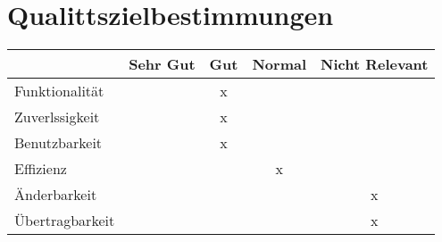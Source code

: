 
\section{Qualittszielbestimmungen}


\begin{center}
	\begin{tabular}{l|c|c|c|c}
	                & Sehr Gut & Gut & Normal & Nicht Relevant \\ \hline \hline
	Funktionalität  &          &  x  &        &                \\ \hline
	Zuverlssigkeit  &          &  x  &        &                \\ \hline
	Benutzbarkeit   &          &  x  &        &                \\ \hline
	Effizienz       &          &     &   x    &                \\ \hline
	Änderbarkeit    &          &     &        &    x           \\ \hline
	Übertragbarkeit &          &     &        &    x           \\
	\end{tabular}
\end{center}
